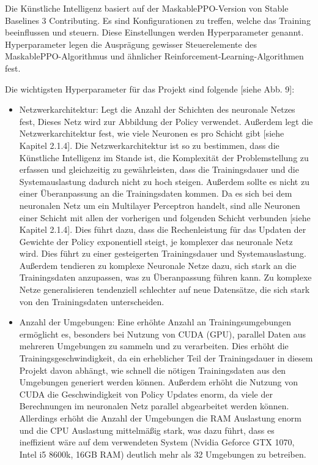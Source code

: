Die Künstliche Intelligenz basiert auf der MaskablePPO-Version von Stable Baselines 3 Contributing. Es sind Konfigurationen zu treffen, welche das Training beeinflussen und steuern. Diese Einstellungen werden Hyperparameter genannt. Hyperparameter legen die Ausprägung gewisser Steuerelemente des MaskablePPO-Algorithmus und ähnlicher Reinforcement-Learning-Algorithmen fest.

Die wichtigsten Hyperparameter für das Projekt sind folgende [siehe Abb. 9]:

\begin{itemize} 
\item Netzwerkarchitektur: Legt die Anzahl der Schichten des neuronale Netzes fest, Dieses Netz wird zur Abbildung der Policy verwendet. Außerdem legt die Netzwerkarchitektur fest, wie viele Neuronen es pro Schicht gibt [siehe Kapitel 2.1.4]. Die Netzwerkarchitektur ist so zu bestimmen, dass die Künstliche Intelligenz im Stande ist, die Komplexität der Problemstellung zu erfassen und gleichzeitig zu gewährleisten, dass die Trainingsdauer und die Systemauslastung dadurch nicht zu hoch steigen. Außerdem sollte es nicht zu einer Überanpassung an die Trainingsdaten kommen. Da es sich bei dem neuronalen Netz um ein Multilayer Perceptron handelt, sind alle Neuronen einer Schicht mit allen der vorherigen und folgenden Schicht verbunden [siehe Kapitel 2.1.4]. Dies führt dazu, dass die Rechenleistung für das Updaten der Gewichte der Policy exponentiell steigt, je komplexer das neuronale Netz wird. Dies führt zu einer gesteigerten Trainingsdauer und Systemauslastung. Außerdem tendieren zu komplexe Neuronale Netze dazu, sich stark an die Trainingsdaten anzupassen, was zu Überanpassung führen kann. Zu komplexe Netze generalisieren tendenziell schlechter auf neue Datensätze, die sich stark von den Trainingsdaten unterscheiden.

\item Anzahl der Umgebungen: Eine erhöhte Anzahl an Trainingsumgebungen ermöglicht es, besonders bei Nutzung von CUDA (GPU), parallel Daten aus mehreren Umgebungen zu sammeln und zu verarbeiten. Dies erhöht die Trainingsgeschwindigkeit, da ein erheblicher Teil der Trainingsdauer in diesem Projekt davon abhängt, wie schnell die nötigen Trainingsdaten aus den Umgebungen generiert werden können. Außerdem erhöht die Nutzung von CUDA die Geschwindigkeit von Policy Updates enorm, da viele der Berechnungen im neuronalen Netz parallel abgearbeitet werden können. Allerdings erhöht die Anzahl der Umgebungen die RAM Auslastung enorm und die CPU Auslastung mittelmäßig stark, was dazu führt, dass es ineffizient wäre auf dem verwendeten System (Nvidia Geforce GTX 1070, Intel i5 8600k, 16GB RAM) deutlich mehr als 32 Umgebungen zu betreiben.


\end{itemize}
